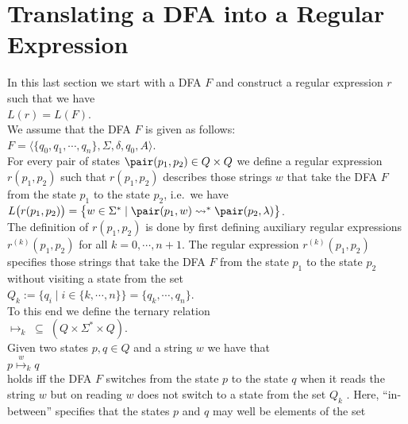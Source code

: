 \section{Translating a \textsc{DFA} into a Regular Expression}
In this last section we start with a \textsc{DFA} $F$ and construct a regular expression $r$
such that we have
\\[0.2cm]
\hspace*{1.3cm}
$L(r) = L(F)$. 
\\[0.2cm]
We assume that the \textsc{DFA} $F$ is given as follows:
\\[0.2cm]
\hspace*{1.3cm}
$F = \bigl\langle \{ q_0, q_1, \cdots, q_n \}, \Sigma, \delta, q_0, A \bigr\rangle$.
\\[0.2cm]
For every pair of states $\pair(p_1,p_2) \in Q \times Q$ we define a regular expression
$r(p_1, p_2)$ such that $r(p_1, p_2)$ describes those strings $w$ that take the \textsc{DFA} $F$ from the state
$p_1$ to the state $p_2$, i.e.~we have
\\[0.2cm]
\hspace*{1.3cm}
$L\bigl(r(p_1, p_2)\bigr) = 
  \bigl\{ w \in \Sigma^* \mid \pair(p_1,w) \leadsto^* \pair(p_2, \lambda) \bigr\}$.
\\[0.2cm]  
The definition of $r(p_1, p_2)$ is done by first defining auxiliary regular expressions 
$r^{(k)}(p_1, p_2)$ for all $k =0,\cdots,n+1$.   The regular expression $r^{(k)}(p_1, p_2)$ specifies those
strings that take the \textsc{DFA} $F$ from the state
$p_1$ to the state $p_2$ without visiting a state from the set
\\[0.2cm]
\hspace*{1.3cm}
$Q_k := \bigl\{ q_i \mid i \in \{k,\cdots,n \}  \bigl\} = \{ q_k, \cdots, q_n \}$.
\\[0.2cm]
To this end we define the ternary relation
\\[0.2cm]
\hspace*{1.3cm}
$\mapsto_k \;\subseteq\; (Q \times \Sigma^* \times Q)$.
\\[0.2cm]
Given two states $p, q \in Q$ and a string $w$ we have that
\\[0.2cm]
\hspace*{1.3cm}
$p \stackrel{w}{\mapsto}_k q$
\\[0.2cm]
holds iff the \textsc{DFA} $F$ switches from the state $p$ to the state $q$ when it reads the string $w$
but on reading $w$ does not switch to a state from the set
$Q_k$ .  Here, ``in-between'' specifies that the states $p$ and $q$ may well be elements of the set
